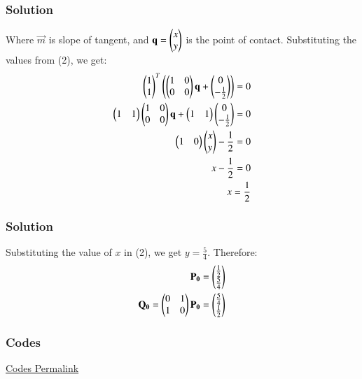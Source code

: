 \documentclass{beamer}
\begin{document}
\begin{frame}[fragile]
    \frametitle{Solution}
Where $\vec{m}$ is slope of tangent, and $\mathbf{q} = \begin{pmatrix}x\\y\end{pmatrix}$ is the point of contact.
Substituting the values from (2), we get:
\begin{align}
    \begin{pmatrix}1\\1\end{pmatrix}^T\left(\begin{pmatrix}1&0\\0&0\end{pmatrix}\mathbf{q} + \begin{pmatrix}0\\-\frac{1}{2}\end{pmatrix}\right) = 0\\
    \begin{pmatrix}1&1\end{pmatrix}\begin{pmatrix}1&0\\0&0\end{pmatrix}\mathbf{q} + \begin{pmatrix}1 & 1\end{pmatrix}\begin{pmatrix}0\\-\frac{1}{2}\end{pmatrix} = 0\\
    \begin{pmatrix}1&0\end{pmatrix}\begin{pmatrix}x\\y\end{pmatrix} -\frac{1}{2} = 0\\
    x - \frac{1}{2} = 0\\
    x = \frac{1}{2}
\end{align}

\end{frame}
\begin{frame}[fragile]
    \frametitle{Solution}
Substituting the value of $x$ in (2), we get $y = \frac{5}{4}$. Therefore:
\begin{align}
\mathbf{P_0} = \begin{pmatrix}\frac{1}{2} \\ \frac{5}{4}\end{pmatrix}\\
\mathbf{Q_0} = \begin{pmatrix}0&1\\1&0\end{pmatrix}\mathbf{P_0} = \begin{pmatrix}\frac{5}{4} \\ \frac{1}{2}\end{pmatrix}
\end{align}
\end{frame}


\begin{frame}[fragile]
    \frametitle{Codes}
\href{https://github.com/AdityaAppana/ee1030-2025/tree/c75597a082af90e6a6b10c85ca79d06aa3d9b661/ee25btech11004/matgeo/10.7.53/Codes}{Codes Permalink}
\end{frame}
\end{document}
